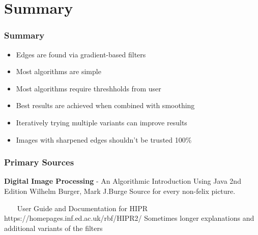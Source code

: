 \section{Summary}
\begin{frame}
	\frametitle{Summary}
	\begin{LARGE}
		\begin{itemize}
			\item Edges are found via gradient-based filters
			\item Most algorithms are simple
			\item Most algorithms require threshholds from user
			\item Best results are achieved when combined with smoothing
			\item Iteratively trying multiple variants can improve results
			\item Images with sharpened edges shouldn't be trusted 100\%
		\end{itemize}
	\end{LARGE}
\end{frame}
\begin{frame}
	\frametitle{Primary Sources}
	\textbf{Digital Image Processing} - An Algorithmic Introduction Using Java 2nd Edition
	\newline Wilhelm	Burger, Mark J.Burge
	\newline Source for every non-felix picture.
	
	~\newline ~\newline ~\newline
	User Guide and Documentation for HIPR
	\newline https://homepages.inf.ed.ac.uk/rbf/HIPR2/
	\newline Sometimes longer explanations and additional variants of the filters 
\end{frame}